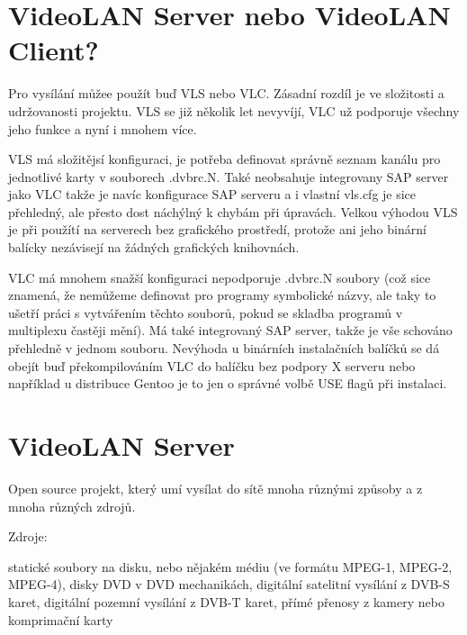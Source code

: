 \vspace{10pt}

\section{VideoLAN Server nebo VideoLAN Client?}

Pro vysílání můžee použít buď VLS nebo VLC. Zásadní rozdíl je ve složitosti a udržovanosti projektu. VLS se již několik let nevyvíjí, VLC už podporuje všechny jeho funkce a nyní i mnohem více.

VLS má složitějsí konfiguraci, je potřeba definovat správně seznam kanálu pro jednotlivé karty v souborech .dvbrc.N. Také neobsahuje integrovany SAP server jako VLC takže je navíc konfigurace SAP serveru a i vlastní vls.cfg je sice přehledný, ale přesto dost náchýlný k chybám při úpravách. Velkou výhodou VLS je při použítí na serverech bez grafického prostředí, protože ani jeho binární balícky nezávisejí na žádných grafických knihovnách.

VLC má mnohem snažší konfiguraci nepodporuje .dvbrc.N soubory (což sice znamená, že nemůžeme definovat pro programy symbolické názvy, ale taky to ušetří práci s vytvářením těchto souborů, pokud se skladba programů v multiplexu častěji mění). Má také integrovaný SAP server, takže je vše schováno přehledně v jednom souboru. Nevýhoda u binárních instalačních balíčků se dá obejít buď překompilováním VLC do balíčku bez podpory X serveru nebo například u distribuce Gentoo je to jen o správné volbě USE flagů při instalaci.

\section{VideoLAN Server}

Open source projekt, který umí vysílat do sítě mnoha různými způsoby a z mnoha různých zdrojů.

\vspace{10pt}

Zdroje:

\vspace{10pt}

statické soubory na disku, nebo nějakém médiu (ve formátu MPEG-1, MPEG-2, MPEG-4),
disky DVD v DVD mechanikách,
digitální satelitní vysílání z DVB-S karet,
digitální pozemní vysílání z DVB-T karet,
přímé přenosy z kamery nebo komprimační karty

\vspace{10pt}

